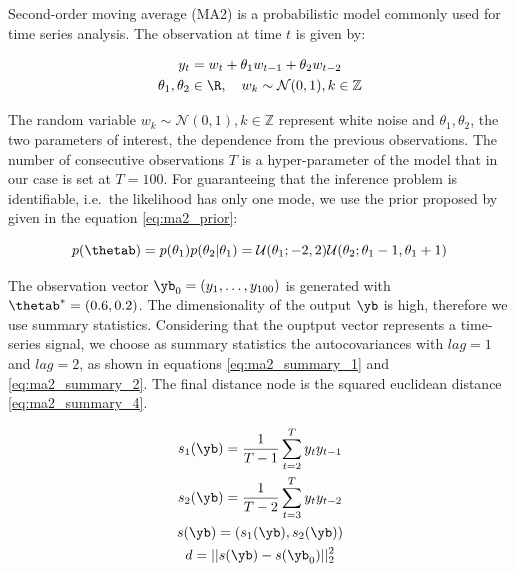 Second-order moving average (MA2) is a probabilistic model commonly
used for time series analysis. The observation at time $t$ is given
by:

\begin{gather} \label{eq:ma2}
y_t = w_t + \theta_1 w_{t-1} + \theta_2 w_{t-2}\\
\theta_1, \theta_2 \in \R, \quad  w_k \sim \mathcal{N}(0,1), k \in \mathbb{Z}
\end{gather}

\noindent
The random variable $w_{k} \sim \mathcal{N}(0,1), k \in \mathbb{Z}$
represent white noise and $\theta_1, \theta_2$, the two parameters of
interest, the dependence from the previous observations. The number of
consecutive observations $T$ is a hyper-parameter of the model that in
our case is set at $T=100$. For guaranteeing that the inference
problem is identifiable, i.e.\ the likelihood has only one mode, we
use the prior proposed by \cite{Marin2012} given in the equation
\eqref{eq:ma2_prior}:

\begin{equation} \label{eq:ma2_prior}
p(\thetab) = p(\theta_1)p(\theta_2|\theta_1)
= \mathcal{U}(\theta_1;-2,2)\mathcal{U}(\theta_2;\theta_1-1, \theta_1+1)
\end{equation}


\noindent
The observation vector $\yb_0 = (y_1, \ldots, y_{100})$ is generated
with $\thetab^*=(0.6, 0.2)$. The dimensionality of the output $\yb$ is
high, therefore we use summary statistics. Considering that the
ouptput vector represents a time-series signal, we choose as summary
statistics the autocovariances with $lag=1$ and $lag=2$, as shown in
equations \eqref{eq:ma2_summary_1} and \eqref{eq:ma2_summary_2}. The
final distance node is the squared euclidean
distance \eqref{eq:ma2_summary_4}.

\begin{gather} \label{eq:ma2_summary_1}
  s_1(\yb) = \frac{1}{T-1} \sum_{t=2}^T y_ty_{t-1}\\ \label{eq:ma2_summary_2}
  s_2(\yb) = \frac{1}{T-2} \sum_{t=3}^T y_ty_{t-2} \\
  s(\yb) = (s_1(\yb), s_2(\yb))\\ \label{eq:ma2_summary_4}
  d = ||s(\yb) - s(\yb_0)||_2^2 
\end{gather}

